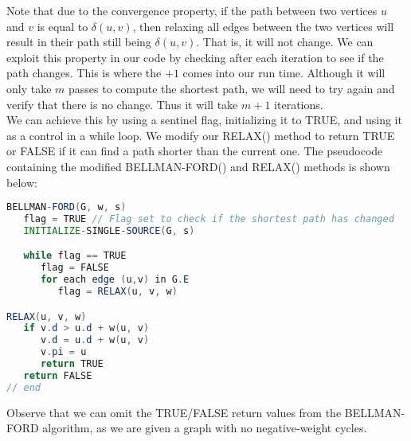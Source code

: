 \documentclass[20pt]{article} %
\begin{document}
Note that due to the convergence property, if the path between two vertices $u$ and $v$ is equal to $\delta(u,v)$, then relaxing all edges between the two vertices will result in their path still being $\delta(u,v)$. That is, it will not change.  We can exploit this property in our code by checking after each iteration to see if the path changes.  This is where the $+ 1$ comes into our run time.  Although it will only take $m$ passes to compute the shortest path, we will need to try again and verify that there is no change.  Thus it will take $m+1$ iterations. \\

We can achieve this by using a sentinel flag, initializing it to TRUE, and using it as a control in a while loop.  We modify our RELAX() method to return TRUE or FALSE if it can find a path shorter than the current one.  The pseudocode containing the modified BELLMAN-FORD() and RELAX() methods is shown below:

\begin{lstlisting}[language=java]
BELLMAN-FORD(G, w, s)
   flag = TRUE // Flag set to check if the shortest path has changed
   INITIALIZE-SINGLE-SOURCE(G, s)

   while flag == TRUE
      flag = FALSE
      for each edge (u,v) in G.E
         flag = RELAX(u, v, w)

RELAX(u, v, w)
   if v.d > u.d + w(u, v)
      v.d = u.d + w(u, v)
      v.pi = u
      return TRUE
   return FALSE
// end
\end{lstlisting}

Observe that we can omit the TRUE/FALSE return values from the BELLMAN-FORD algorithm, as we are given a graph with no negative-weight cycles.
\end{document}
